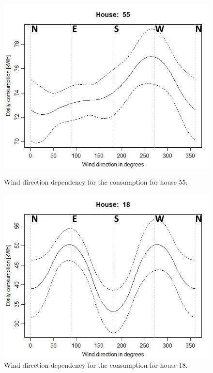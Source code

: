 \begin{figure}[!htb]
    \centering
    \begin{minipage}{0.8\textwidth}
        \centering
        \includegraphics[width=.9\textwidth]{../../../figures/Wplot55.jpeg}
        \caption{Wind direction dependency for the consumption for house 55.}
        \label{fig: Wplot55}
    \end{minipage}
    \begin{minipage}{0.8\textwidth}
        \centering
        \includegraphics[width=.9\textwidth]{../../../figures/Wplot18.jpeg}
        \caption{Wind direction dependency for the consumption for house 18.}
        \label{fig: Wplot18}
    \end{minipage}
\end{figure}

